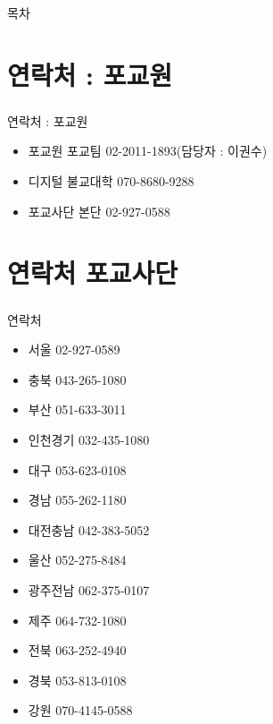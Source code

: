 \documentclass[aspectratio=1610,14pt,xcolor=pdftex,dvipsnames,table,handout]{beamer}
\begin{document}
		\begin{frame} [plain]{목차}
		\tableofcontents%
		\end{frame}


		\section{ 연락처 : 포교원 }
		\begin{frame} [t,plain]
		\frametitle{ }
			\begin{block} { 연락처 : 포교원  }
			\setlength{\leftmargini}{3em}			
			\begin{itemize}
			\item 포교원 포교팀 02-2011-1893(담당자 : 이권수)
			\item 디지털 불교대학 070-8680-9288
			\item 포교사단 본단 02-927-0588
			\end{itemize}
			\end{block}						
								
		\end{frame}						


		\section{ 연락처 포교사단 }
		\begin{frame} [t,plain]
		\frametitle{ }
			\begin{block} { 연락처 }
			\setlength{\leftmargini}{3em}			
			\begin{itemize}
			\item 서울 02-927-0589
			\item 충북 043-265-1080
			\item 부산 051-633-3011
			\item 인천경기 032-435-1080
			\item 대구 053-623-0108
			\item 경남 055-262-1180
			\item 대전충남 042-383-5052
			\item 울산 052-275-8484
			\item 광주전남 062-375-0107
			\item 제주 064-732-1080
			\item 전북 063-252-4940
			\item 경북 053-813-0108
			\item 강원 070-4145-0588
			\end{itemize}
			\end{block}						
								
		\end{frame}						
\end{document}
